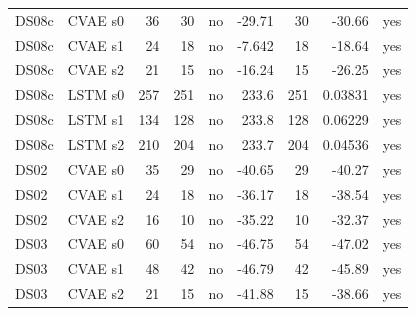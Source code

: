 \documentclass[10pt]{article}
\begin{document}
{\begin{longtable}{llrrlrrrl}
\midrule
DS08c & CVAE s0 & 36 & 30 & no & -29.71 & 30 & -30.66 & yes \\
DS08c & CVAE s1 & 24 & 18 & no & -7.642 & 18 & -18.64 & yes \\
DS08c & CVAE s2 & 21 & 15 & no & -16.24 & 15 & -26.25 & yes \\
DS08c & LSTM s0 & 257 & 251 & no & 233.6 & 251 & 0.03831 & yes \\
DS08c & LSTM s1 & 134 & 128 & no & 233.8 & 128 & 0.06229 & yes \\
DS08c & LSTM s2 & 210 & 204 & no & 233.7 & 204 & 0.04536 & yes \\
\midrule
DS02 & CVAE s0 & 35 & 29 & no & -40.65 & 29 & -40.27 & yes \\
DS02 & CVAE s1 & 24 & 18 & no & -36.17 & 18 & -38.54 & yes \\
DS02 & CVAE s2 & 16 & 10 & no & -35.22 & 10 & -32.37 & yes \\
\midrule
DS03 & CVAE s0 & 60 & 54 & no & -46.75 & 54 & -47.02 & yes \\
DS03 & CVAE s1 & 48 & 42 & no & -46.79 & 42 & -45.89 & yes \\
DS03 & CVAE s2 & 21 & 15 & no & -41.88 & 15 & -38.66 & yes \\
\end{longtable}
\vspace{-0.6em}
}

\clearpage
\end{document}
